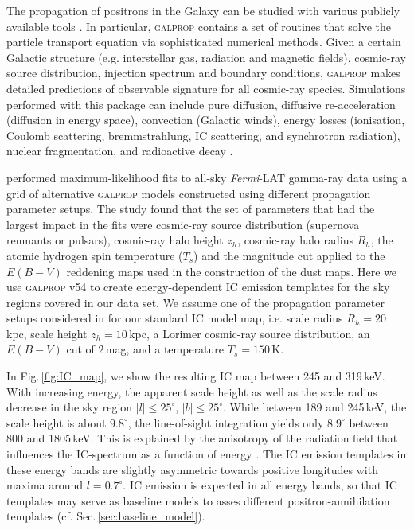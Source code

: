 \documentclass[doublespace,nopageskip]{VTthesis}
\begin{document}
The propagation of positrons in the Galaxy can be studied with various publicly available tools \cite[e.g., \textsc{galprop} or \textsc{dragon},][]{2007ARNPS..57..285S,2008NIMPA.588...22E}.
%
In particular, \textsc{galprop} contains a set of routines that solve the particle transport equation via sophisticated numerical methods.
%
Given a certain Galactic structure (e.g. interstellar gas, radiation and magnetic fields), cosmic-ray source distribution, injection spectrum and boundary conditions, \textsc{galprop} makes detailed predictions of observable signature for all cosmic-ray species.
%
Simulations performed with this package can include pure diffusion, diffusive re-acceleration (diffusion in energy space), convection (Galactic winds),  energy losses (ionisation, Coulomb scattering, bremmstrahlung, IC scattering, and synchrotron radiation), nuclear fragmentation, and radioactive decay \citep{2005AIPC..769.1612M}.

\citet{2012ApJ...750....3A} performed maximum-likelihood fits to all-sky \textit{Fermi}-LAT gamma-ray data using a grid of alternative \textsc{galprop} models constructed using different propagation parameter setups.
%
The study found that the set of parameters that had the largest impact in the fits were cosmic-ray source distribution (supernova remnants or pulsars), cosmic-ray halo height $z_h$, cosmic-ray halo radius $R_h$, the atomic hydrogen spin temperature ($T_s$) and the magnitude cut applied to the $E(B-V)$ reddening maps used in the construction of the dust maps.
%
Here we use \textsc{galprop} v54 \citep{2007ARNPS..57..285S} to create energy-dependent {IC} emission templates for the sky regions covered in our data set.
%
We assume one of the propagation parameter setups considered in \citep{2012ApJ...750....3A} for our standard IC model map, i.e. scale radius $R_h = 20$\,kpc, scale height $z_h = 10$\,kpc, a Lorimer cosmic-ray source distribution, an $E(B-V)$ cut of $2$\,mag, and a temperature $T_s = 150$\,K.

In Fig.\,\ref{fig:IC_map}, we show the resulting {IC} map between 245 and 319\,keV.
%
With increasing energy, the apparent scale height as well as the scale radius decrease in the sky region $|l|\leq25^{\circ}$, $|b|\leq25^{\circ}$.
%
While between 189 and 245\,keV, the scale height is about $9.8^{\circ}$, the line-of-sight integration yields only $8.9^{\circ}$ between 800 and 1805\,keV.
%
This is explained by the anisotropy of the radiation field that influences the {IC}-spectrum as a function of energy \citep{2000ApJ...528..357M}.
%
The {IC} emission templates in these energy bands are slightly asymmetric towards positive longitudes with maxima around $l=0.7^{\circ}$.
%
{IC} emission is expected in all energy bands, so that {IC} templates may serve as baseline models to asses different positron-annihilation templates (cf. Sec.\,\ref{sec:baseline_model}).
\end{document}
